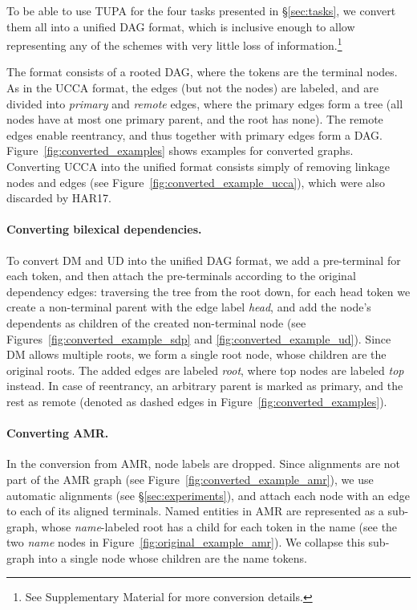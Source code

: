 \documentclass[11pt,a4paper]{article}
\begin{document}
To be able to use TUPA for the four tasks presented in \S\ref{sec:tasks},
we convert them all into a unified DAG format, which is inclusive enough to
allow representing any of the schemes with very little loss of information.\footnote{See
Supplementary Material for more conversion details.}

The format consists of a rooted DAG, where the tokens are the terminal nodes.
As in the UCCA format, the edges (but not the nodes) are labeled,
and are divided into \textit{primary} and \textit{remote} edges,
where the primary edges form a tree (all nodes have at most one primary parent,
and the root has none).
The remote edges enable reentrancy, and thus together with primary edges
form a DAG.
Figure~\ref{fig:converted_examples} shows examples for converted graphs.
Converting UCCA into the unified format consists simply of removing linkage 
nodes and edges (see Figure~\ref{fig:converted_example_ucca}), which were
also discarded by HAR17.

\paragraph{Converting bilexical dependencies.}
To convert DM and UD into the unified DAG format,
we add a pre-terminal for each token,
and then attach the pre-terminals according to the original dependency edges:
traversing the tree from the root down, for each head token we create a non-terminal
parent with the edge label {\it head},
and add the node's dependents as children of the created non-terminal node
(see Figures~\ref{fig:converted_example_sdp} and \ref{fig:converted_example_ud}).
Since DM allows multiple roots, we form a single root node, whose children
are the original roots. The added edges are labeled \textit{root}, where
top nodes are labeled \textit{top} instead.
In case of reentrancy, an arbitrary parent is marked as primary, and the rest as remote
(denoted as dashed edges in Figure~\ref{fig:converted_examples}).

\paragraph{Converting AMR.}
In the conversion from AMR, node labels are dropped.
Since alignments are not part of the AMR graph (see Figure~\ref{fig:converted_example_amr}),
we use automatic alignments (see \S\ref{sec:experiments}),
and attach each node with an edge to each of its aligned terminals.
%
Named entities in AMR are represented as a sub-graph, whose \textit{name}-labeled root
has a child for each token in the name (see the two \textit{name} nodes in Figure~\ref{fig:original_example_amr}).
We collapse this sub-graph into a single node whose children are the name tokens.
\end{document}
